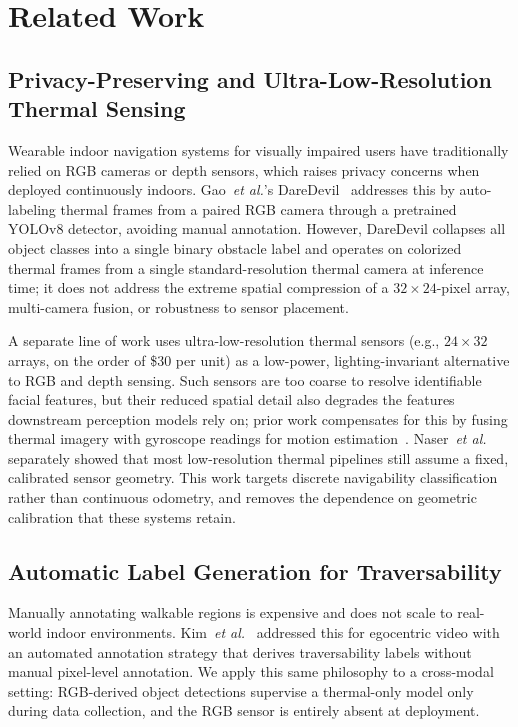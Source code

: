 \section{Related Work}

\subsection{Privacy-Preserving and Ultra-Low-Resolution Thermal Sensing}

Wearable indoor navigation systems for visually impaired users have traditionally relied on RGB cameras or depth sensors, which raises privacy concerns when deployed continuously indoors. Gao~\textit{et al.}'s DareDevil~\cite{gao2025daredevil} addresses this by auto-labeling thermal frames from a paired RGB camera through a pretrained YOLOv8 detector, avoiding manual annotation. However, DareDevil collapses all object classes into a single binary obstacle label and operates on colorized thermal frames from a single standard-resolution thermal camera at inference time; it does not address the extreme spatial compression of a $32\times24$-pixel array, multi-camera fusion, or robustness to sensor placement.

A separate line of work uses ultra-low-resolution thermal sensors (e.g., $24\times32$ arrays, on the order of \$30 per unit) as a low-power, lighting-invariant alternative to RGB and depth sensing. Such sensors are too coarse to resolve identifiable facial features, but their reduced spatial detail also degrades the features downstream perception models rely on; prior work compensates for this by fusing thermal imagery with gyroscope readings for motion estimation~\cite{thermal_gyro_odom}. Naser~\textit{et al.}~\cite{naser2022calibration} separately showed that most low-resolution thermal pipelines still assume a fixed, calibrated sensor geometry. This work targets discrete navigability classification rather than continuous odometry, and removes the dependence on geometric calibration that these systems retain.

\subsection{Automatic Label Generation for Traversability}

Manually annotating walkable regions is expensive and does not scale to real-world indoor environments. Kim~\textit{et al.}~\cite{kim2024traversability} addressed this for egocentric video with an automated annotation strategy that derives traversability labels without manual pixel-level annotation. We apply this same philosophy to a cross-modal setting: RGB-derived object detections supervise a thermal-only model only during data collection, and the RGB sensor is entirely absent at deployment.

